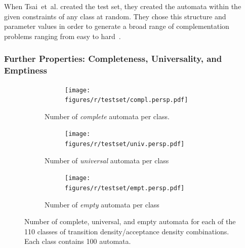 When Tsai~et~al. created the \goal{} test set, they created the automata within the given constraints of any class at random. They chose this structure and parameter values in order to generate a broad range of complementation problems ranging from easy to hard~\cite{2010_tsai}.


\subsubsection{Further Properties: Completeness, Universality, and Emptiness}

\renewcommand{\tabcolsep}{0.05cm}   %
\renewcommand{\arraystretch}{1.05}
\begin{figure}[htb!]
  \centering
  \begin{subfigure}{\textwidth}
    \begin{subtable}{0.47\textwidth}
    
    \end{subtable}
    \hfill
    \begin{subfigure}{0.52\textwidth}
    \texttt{[image: figures/r/testset/compl.persp.pdf]}
    \end{subfigure}
  \caption{Number of \textit{complete} automata per class.}
  \end{subfigure}

 \begin{subfigure}{\textwidth}
    \begin{subtable}{0.47\textwidth}
    
    \end{subtable}
    \hfill
    \begin{subfigure}{0.52\textwidth}
    \texttt{[image: figures/r/testset/univ.persp.pdf]}
    \end{subfigure}
  \caption{Number of \textit{universal} automata per class}
  \end{subfigure}

  \begin{subfigure}{\textwidth}
    \begin{subtable}{0.47\textwidth}
    
    \end{subtable}
    \hfill
    \begin{subfigure}{0.52\textwidth}
    \texttt{[image: figures/r/testset/empt.persp.pdf]}
    \end{subfigure}
  \caption{Number of \textit{empty} automata per class}
  \end{subfigure}
\caption{Number of complete, universal, and empty automata for each of the 110 classes of transition density/acceptance density combinations. Each class contains 100 automata.}
\label{testset_analysis}
\end{figure}
\tablestyle  %

